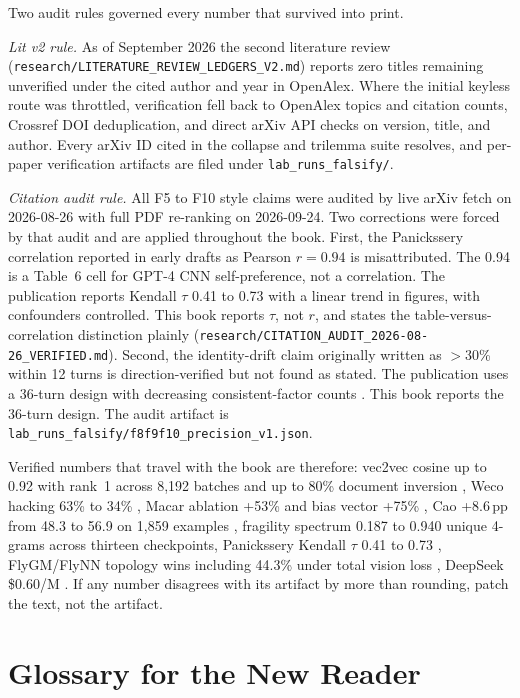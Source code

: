 Two audit rules governed every number that survived into print.

\textit{Lit v2 rule.} As of September 2026 the second literature review (\texttt{research/LITERATURE\_REVIEW\_LEDGERS\_V2.md}) reports zero titles remaining unverified under the cited author and year in OpenAlex. Where the initial keyless route was throttled, verification fell back to OpenAlex topics and citation counts, Crossref DOI deduplication, and direct arXiv API checks on version, title, and author. Every arXiv ID cited in the collapse and trilemma suite resolves, and per-paper verification artifacts are filed under \texttt{lab\_runs\_falsify/}.

\textit{Citation audit rule.} All F5 to F10 style claims were audited by live arXiv fetch on 2026-08-26 with full PDF re-ranking on 2026-09-24. Two corrections were forced by that audit and are applied throughout the book. First, the Panickssery correlation reported in early drafts as Pearson $r=0.94$ is misattributed. The 0.94 is a Table~6 cell for GPT-4 CNN self-preference, not a correlation. The publication reports Kendall $\tau$ 0.41 to 0.73 with a linear trend in figures, with confounders controlled. This book reports $\tau$, not $r$, and states the table-versus-correlation distinction plainly (\texttt{research/CITATION\_AUDIT\_2026-08-26\_VERIFIED.md}). Second, the identity-drift claim originally written as $>$30\% within 12 turns is direction-verified but not found as stated. The publication uses a 36-turn design with decreasing consistent-factor counts \cite{choi2024}\@. This book reports the 36-turn design. The audit artifact is \texttt{lab\_runs\_falsify/f8f9f10\_precision\_v1.json}.

Verified numbers that travel with the book are therefore: vec2vec cosine up to 0.92 with rank~1 across 8,192 batches and up to 80\% document inversion \cite{jha2025}, Weco hacking 63\% to 34\% \cite{weco2026}, Macar ablation +53\% and bias vector +75\% \cite{macar2026}, Cao +8.6\,pp from 48.3 to 56.9 on 1,859 examples \cite{cao2026}, fragility spectrum 0.187 to 0.940 unique 4-grams across thirteen checkpoints, Panickssery Kendall $\tau$ 0.41 to 0.73 \cite{panickssery2024}, FlyGM/FlyNN topology wins including 44.3\% under total vision loss \cite{flygm2026,flynn2026}, DeepSeek \$0.60/M \cite{deepseek2026}. If any number disagrees with its artifact by more than rounding, patch the text, not the artifact.

\section{Glossary for the New Reader}
\label{sec:appendix-glossary}

